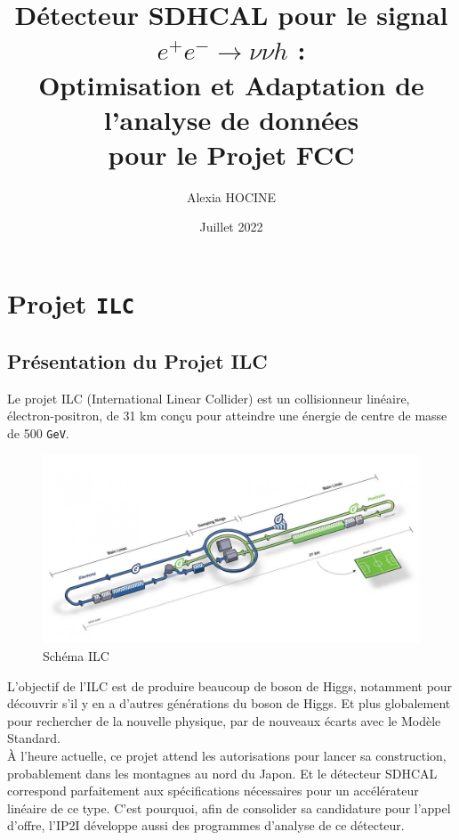 \documentclass[10pt,a4paper]{report}
\author{Alexia \textsc{HOCINE}}
\title{Détecteur SDHCAL pour le signal  $ e^{+} e^{-} \longrightarrow \nu \nu h $ :\\Optimisation et Adaptation de l'analyse de données\\pour le Projet FCC 
}
\date{Juillet 2022}
\newcommand{\MS}{Modèle Standard\xspace}
\newcommand{\GeV}{\texttt{GeV}}
\begin{document}






\tableofcontents




\chapter{Projet \texttt{ILC}}

\section{Présentation du Projet ILC}

Le projet ILC (International Linear Collider) est un collisionneur linéaire, électron-positron, de 31 km conçu pour atteindre une énergie de centre de masse de 500 \GeV \cite{cern:ilc}. \\

\begin{figure}[h!]
	\center
	\includegraphics[width=\textwidth]{../img/ilc.jpg} 
	\caption{Schéma ILC\cite{cern:ilc}}
	\label{ilc:schema}
\end{figure}

L'objectif de l'ILC est de produire beaucoup de boson de Higgs, notamment pour découvrir s'il y en a d'autres générations du boson de Higgs. Et plus globalement pour rechercher de la nouvelle physique, par de nouveaux écarts avec le \MS.\\

À l'heure actuelle, ce projet attend les autorisations pour lancer sa construction, probablement dans les montagnes au nord du Japon. 
Et le détecteur SDHCAL correspond parfaitement aux spécifications nécessaires pour un accélérateur linéaire de ce type.
C'est pourquoi, afin de consolider sa candidature pour l'appel d'offre, l'IP2I développe aussi des programmes d'analyse de ce détecteur.
\end{document}
